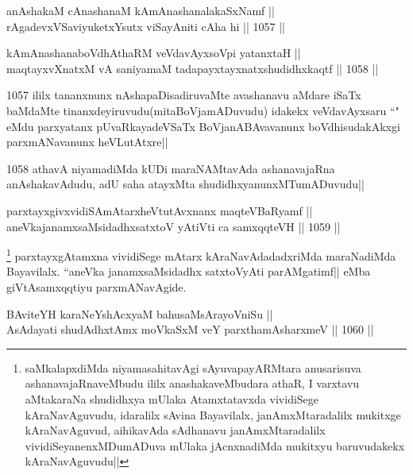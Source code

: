 
\begin{shl}
anAshakaM cAnashanaM kAmAnashanalakaSxNamf ||  \\
rAgadevxVSaviyuketxYsutx viSayAniti cA\s \s ha hi ||  1057 ||  
\end{shl}
				
\begin{shl}
kAmAnashanaboVdhAthaRM veVdavAyxsoV\s pi yatanxtaH || \\
maqtayxvXnatxM vA saniyamaM tadapayxtayxnatxshudidhxkaqtf ||  1058 ||  
\end{shl}

\begin{artha}
1057 ililx tananxnunx nAshapaDisadiruvaMte avashanavu aMdare iSaTx baMdaMte tinanxdeyiruvudu(mitaBoVjamADuvudu) idakekx veVdavAyxsaru ``\stext" eMdu parxyatanx pUvaRkayadeVSaTx BoVjanABAvavanunx boVdhisudakAkxgi parxmANavanunx heVLutAtxre||
\end{artha}

\begin{artha}
1058 athavA niyamadiMda kUDi maraNAMtavAda ashanavajaRna anAshakavAdudu, adU saha atayxMta shudidhxyanunxMTumADuvudu||
\end{artha}

\begin{shl}
parxtayxgivxvidiSAmAtarxheVtutAvxnanx maqteVBaRyamf ||  \\
aneVkajanamxsaMsidadhxsatxtoV yAtiVti ca samxqqteVH ||  1059 ||  
\end{shl}

\begin{artha}
\footnote{saMkalapxdiMda niyamasahitavAgi sAyuvapayARMtara anusarisuva ashanavajaRnaveMbudu ililx anashakaveMbudara athaR, I varxtavu aMtakaraNa shudidhxya mUlaka Atamxtatavxda vividiSege kAraNavAguvudu, idaralilx sAvina Bayavilalx, janAmxMtaradalilx mukitxge kAraNavAguvud, aihikavAda sAdhanavu janAmxMtaradalilx vividiSeyanenxMDumADuva mUlaka jAcnxnadiMda mukitxyu baruvudakekx kAraNavAguvudu||} parxtayxgAtamxna vividiSege mAtarx kAraNavAdadadxriMda maraNadiMda Bayavilalx. ``aneVka janamxsaMsidadhx satxtoVyAti parAMgatimf|| eMba giVtAsamxqqtiyu parxmANavAgide.
\end{artha}


\begin{shl}
BAviteYH karaNeYshAcxyaM bahusaMsArayoVniSu || \\
AsAdayati shudAdhxtAmx moVkaSxM veY parxthamAsharxmeV ||  1060 ||  
\end{shl}

